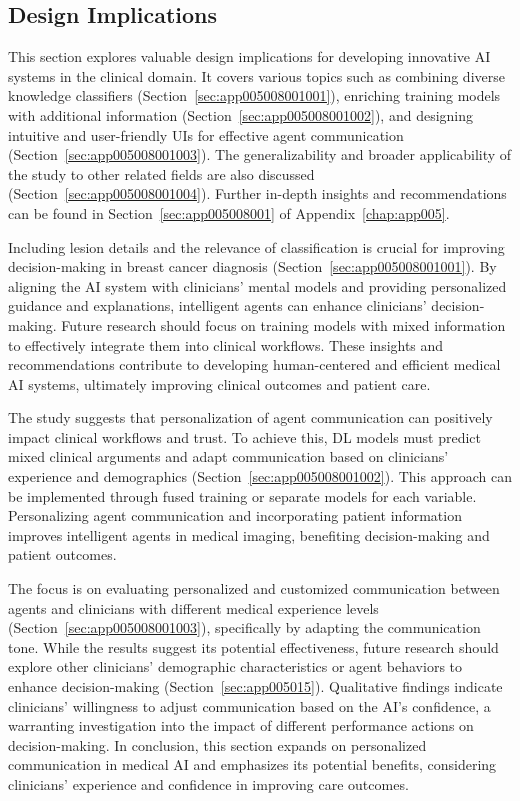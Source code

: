 \subsection{Design Implications}
\label{sec:chap006007001}

This section explores valuable design implications for developing innovative \ac{AI} systems in the clinical domain.
It covers various topics such as combining diverse knowledge classifiers (Section~\ref{sec:app005008001001}), enriching training models with additional information (Section~\ref{sec:app005008001002}), and designing intuitive and user-friendly \acp{UI} for effective agent communication (Section~\ref{sec:app005008001003}).
The generalizability and broader applicability of the study to other related fields are also discussed (Section~\ref{sec:app005008001004}).
Further in-depth insights and recommendations can be found in Section~\ref{sec:app005008001} of Appendix~\ref{chap:app005}.

Including lesion details and the relevance of classification is crucial for improving decision-making in breast cancer diagnosis (Section~\ref{sec:app005008001001}).
By aligning the \ac{AI} system with clinicians' mental models and providing personalized guidance and explanations, intelligent agents can enhance clinicians' decision-making.
Future research should focus on training models with mixed information to effectively integrate them into clinical workflows.
These insights and recommendations contribute to developing human-centered and efficient medical \ac{AI} systems, ultimately improving clinical outcomes and patient care.

The study suggests that personalization of agent communication can positively impact clinical workflows and trust.
To achieve this, \ac{DL} models must predict mixed clinical arguments and adapt communication based on clinicians' experience and demographics (Section~\ref{sec:app005008001002}).
This approach can be implemented through fused training or separate models for each variable.
Personalizing agent communication and incorporating patient information improves intelligent agents in medical imaging, benefiting decision-making and patient outcomes.

The focus is on evaluating personalized and customized communication between agents and clinicians with different medical experience levels (Section~\ref{sec:app005008001003}), specifically by adapting the communication tone.
While the results suggest its potential effectiveness, future research should explore other clinicians' demographic characteristics or agent behaviors to enhance decision-making (Section~\ref{sec:app005015}).
Qualitative findings indicate clinicians' willingness to adjust communication based on the \ac{AI}'s confidence, a warranting investigation into the impact of different performance actions on decision-making.
In conclusion, this section expands on personalized communication in medical \ac{AI} and emphasizes its potential benefits, considering clinicians' experience and confidence in improving care outcomes.

